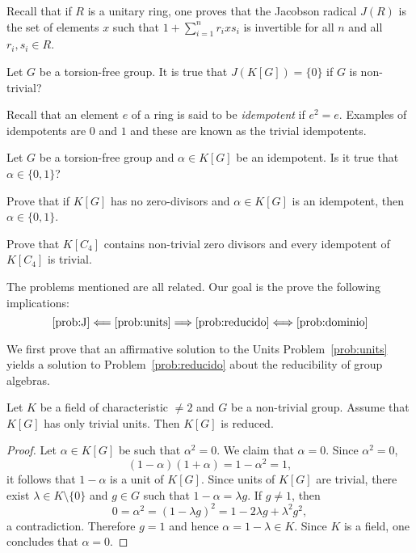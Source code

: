 Recall that if $R$ is a unitary ring, one proves that 
the Jacobson radical $J(R)$ is 
the set of elements $x$ such that
$1+\sum_{i=1}^n r_ixs_i$ is invertible 
for all $n$ and all $r_i,s_i\in R$.


\begin{problem}[Semisimplicity]
	\label{prob:J}
	Let $G$ be a torsion-free group. It is true that 
	$J(K[G])=\{0\}$ if $G$ is non-trivial?
\end{problem}

Recall that an element $e$ of a ring is said to be \emph{idempotent} 
if $e^2=e$. Examples of idempotents are $0$ and $1$ and 
these are known as the trivial idempotents. 

\begin{problem}[Idempotents]
	\label{pro:idempotente}
	Let $G$ be a torsion-free group and $\alpha\in K[G]$ be an idempotent. 
	Is it true that $\alpha\in\{0,1\}$?
\end{problem}

\begin{exercise}
	Prove that if $K[G]$ has no zero-divisors and $\alpha\in K[G]$ is an
	idempotent, then $\alpha\in\{0,1\}$.
\end{exercise}

\begin{exercise}
	Prove that $K[C_4]$ contains non-trivial zero divisors and every
	idempotent of $K[C_4]$ is trivial. 
\end{exercise}

The problems mentioned are all related. Our goal is the prove
the following implications:
\[
	\ref{prob:J}\Longleftarrow\ref{prob:units}\Longrightarrow\ref{prob:reducido}\Longleftrightarrow\ref{prob:dominio}
\]

We first prove that an affirmative solution to the Units
Problem~\ref{prob:units} yields a solution to Problem~\ref{prob:reducido}
about the reducibility of group algebras.

\begin{theorem}
    Let $K$ be a field of characteristic $\ne2$ 
	and $G$ be a non-trivial group. Assume that $K[G]$ has only trivial units.
	Then $K[G]$ is reduced. 
\end{theorem}

\begin{proof}
	Let $\alpha\in K[G]$ be such that $\alpha^2=0$. We claim that 
	$\alpha=0$. Since $\alpha^2=0$, 
	\[
		(1-\alpha)(1+\alpha)=1-\alpha^2=1, 
	\]
	it follows that $1-\alpha$ is a unit of $K[G]$. Since units of $K[G]$ are 
	trivial, there exist $\lambda\in K\setminus\{0\}$ and $g\in G$ such that 
	$1-\alpha=\lambda g$. If $g\ne 1$, then 
	\[
		0=\alpha^2=(1-\lambda g)^2=1-2\lambda g+\lambda^2g^2,
	\]
	a contradiction. Therefore $g=1$ and hence $\alpha=1-\lambda\in K$. Since
	$K$ is a field, one concludes that $\alpha=0$.
\end{proof}


